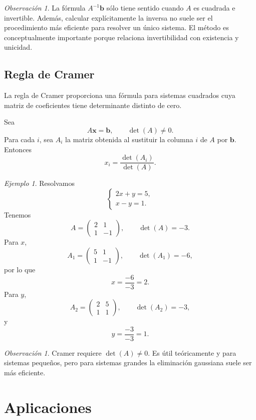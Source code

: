 \documentclass[12pt]{article}
\theoremstyle{remark}
\newtheorem{observacion}[definicion]{Observación}
\newtheorem{ejemplo}[definicion]{Ejemplo}
\begin{document}
\begin{observacion}
La fórmula $A^{-1}\mathbf b$ sólo tiene sentido cuando $A$ es cuadrada e invertible. Además, calcular explícitamente la inversa no suele ser el procedimiento más eficiente para resolver un único sistema. El método es conceptualmente importante porque relaciona invertibilidad con existencia y unicidad.
\end{observacion}
\subsection*{Regla de Cramer}
La regla de Cramer proporciona una fórmula para sistemas cuadrados cuya matriz de coeficientes tiene determinante distinto de cero.

Sea
\[
A\mathbf x=\mathbf b,\qquad \det(A)\neq0.
\]
Para cada $i$, sea $A_i$ la matriz obtenida al sustituir la columna $i$ de $A$ por $\mathbf b$. Entonces
\[
\boxed{x_i=\frac{\det(A_i)}{\det(A)}}.
\]

\begin{ejemplo}
Resolvamos
\[
\begin{cases}
2x+y=5,\\
x-y=1.
\end{cases}
\]
Tenemos
\[
A=
\begin{pmatrix}2&1\\1&-1\end{pmatrix},
\qquad
\det(A)=-3.
\]
Para $x$,
\[
A_1=
\begin{pmatrix}5&1\\1&-1\end{pmatrix},
\qquad
\det(A_1)=-6,
\]
por lo que
\[
x=\frac{-6}{-3}=2.
\]
Para $y$,
\[
A_2=
\begin{pmatrix}2&5\\1&1\end{pmatrix},
\qquad
\det(A_2)=-3,
\]
y
\[
y=\frac{-3}{-3}=1.
\]
\end{ejemplo}

\begin{observacion}
Cramer requiere $\det(A)\neq0$. Es útil teóricamente y para sistemas pequeños, pero para sistemas grandes la eliminación gaussiana suele ser más eficiente.
\end{observacion}
\section{Aplicaciones}
\end{document}
